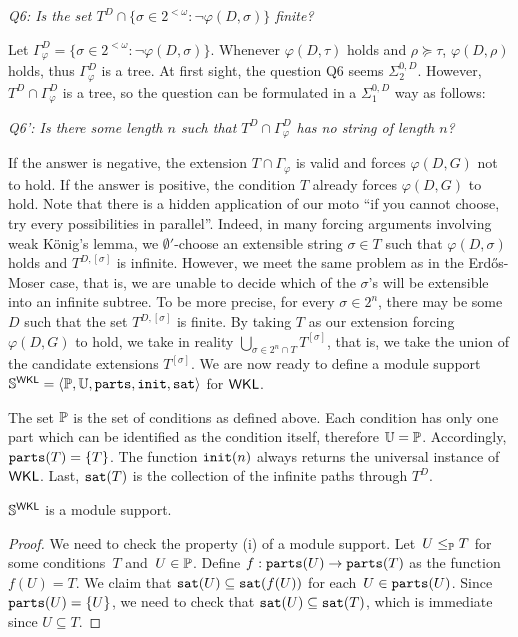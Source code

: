 \smallskip
{\itshape
Q6: Is the set $T^D \cap \{\sigma \in 2^{<\omega} : \neg \varphi(D, \sigma) \}$ finite?
}
\smallskip

Let $\Gamma^D_\varphi = \{\sigma \in 2^{<\omega} : \neg \varphi(D, \sigma) \}$.
Whenever $\varphi(D, \tau)$ holds and $\rho \succeq \tau$, $\varphi(D, \rho)$ holds,
thus $\Gamma^D_\varphi$ is a tree.
At first sight, the question Q6 seems $\Sigma^{0,D}_2$. However, $T^D \cap \Gamma^D_\varphi$ is a tree,
so the question can be formulated in a $\Sigma^{0,D}_1$ way as follows:

\smallskip
{\itshape
Q6': Is there some length $n$ such that $T^D \cap \Gamma^D_\varphi$ has no string of length $n$?
}
\smallskip

If the answer is negative, the extension $T \cap \Gamma_\varphi$
is valid and forces $\varphi(D, G)$ not to hold.
If the answer is positive, the condition $T$ already forces $\varphi(D, G)$ to hold.
Note that there is a hidden application of our moto ``if you cannot choose, try every possibilities in parallel''.
Indeed, in many forcing arguments involving weak K\"onig's lemma,
we $\emptyset'$-choose an extensible string $\sigma \in T$ such that $\varphi(D, \sigma)$ holds
and $T^{D, [\sigma]}$ is infinite. However, we meet the same problem as in the Erd\H{o}s-Moser case,
that is, we are unable to decide which of the $\sigma$'s will be extensible into an infinite subtree.
To be more precise, for every $\sigma \in 2^n$, there may be some $D$ such that the set $T^{D, [\sigma]}$ is finite.
By taking $T$ as our extension forcing $\varphi(D, G)$ to hold, we take in reality $\bigcup_{\sigma \in 2^n \cap T} T^{[\sigma]}$,
that is, we take the union of the candidate extensions $T^{[\sigma]}$.
We are now ready to define a module support $\mathbb{S}^{\operatorname{\sf{WKL}}} = \left\langle \mathbb{P}, \mathbb{U}, \mathtt{parts}, \mathtt{init}, \mathtt{sat} \right\rangle$ for $\operatorname{\sf{WKL}}$.

The set $\mathbb{P}$ is the set of conditions as defined above.
Each condition has only one part which can be identified as the condition itself,
therefore $\mathbb{U} = \mathbb{P}$. Accordingly, $\mathtt{parts}(T) = \{T\}$.
The function $\mathtt{init}(n)$ always returns the universal instance of $\operatorname{\sf{WKL}}$.
Last, $\mathtt{sat}(T)$ is the collection of the infinite paths through $T^D$.

\begin{lemma}
$\mathbb{S}^{\operatorname{\sf{WKL}}}$ is a module support.
\end{lemma}
\begin{proof}
We need to check the property (i) of a module support.
Let~$U \leq_{\mathbb{P}} T$ for some conditions~$T$ and~$U \in \mathbb{P}$.
Define $f : \mathtt{parts}(U) \to \mathtt{parts}(T)$ as the function $f(U) = T$.
We claim that $\mathtt{sat}(U) \subseteq \mathtt{sat}(f(U))$ for each~$U \in \mathtt{parts}(U)$.
Since $\mathtt{parts}(U) = \{U\}$, we need to check that $\mathtt{sat}(U) \subseteq \mathtt{sat}(T)$,
which is immediate since $U \subseteq T$.
\end{proof}

